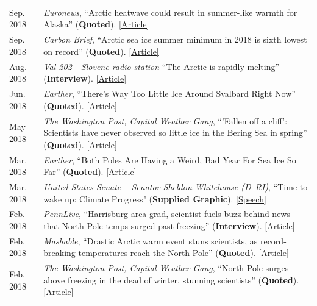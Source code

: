 \documentclass[margin,line,palatino,courier,10pt]{res}
\begin{document}
\begin{resume}
\begin{tabular}{@{}p{0.9in}p{4in}}
Sep. 2018 & \textit{Euronews}, ``Arctic heatwave could result in summer-like warmth for Alaska'' (\textbf{Quoted}). \href{https://www.euronews.com/2018/09/29/arctic-heatwave-could-result-in-summer-like-warmth-in-alaska}{[Article]}\\
Sep. 2018 & \textit{Carbon Brief}, ``Arctic sea ice summer minimum in 2018 is sixth lowest on record'' (\textbf{Quoted}). \href{https://www.carbonbrief.org/arctic-sea-ice-summer-minimum-in-2018-is-sixth-lowest-on-record}{[Article]}\\
Aug. 2018 & \textit{Val 202 - Slovene radio station} ``The Arctic is rapidly melting'' (\textbf{Interview}). \href{https://val202.rtvslo.si/2018/08/sonce-je-odprlo-zemljin-hladilnik/}{[Article]}\\
Jun. 2018 & \textit{Earther}, ``There's Way Too Little Ice Around Svalbard Right Now'' (\textbf{Quoted}). \href{https://earther.com/theres-way-too-little-ice-around-svalbard-right-now-1826567780}{[Article]}\\
May 2018 & \textit{The Washington Post, Capital Weather Gang}, ``'Fallen off a cliff': Scientists have never observed so little ice in the Bering Sea in spring'' (\textbf{Quoted}). \href{https://www.washingtonpost.com/news/capital-weather-gang/wp/2018/05/03/fallen-off-a-cliff-scientists-have-never-observed-so-little-ice-in-the-bering-sea-in-spring/?noredirect=on&utm_term=.cbcf2781b5e4}{[Article]}\\
Mar. 2018 & \textit{Earther}, ``Both Poles Are Having a Weird, Bad Year For Sea Ice So Far'' (\textbf{Quoted}). \href{https://earther.com/both-poles-are-having-a-weird-bad-year-for-sea-ice-so-1824074352}{[Article]}\\
Mar. 2018 & \textit{United States Senate -- Senator Sheldon Whitehouse (D--RI)}, ``Time to wake up: Climate Progress" (\textbf{Supplied Graphic}). \href{https://www.youtube.com/watch?v=C_E5OQgt2SE}{[Speech]}\\
Feb. 2018 & \textit{PennLive}, ``Harrisburg-area grad, scientist fuels buzz behind news that North Pole temps surged past freezing'' (\textbf{Interview}). \href{http://www.pennlive.com/news/2018/02/harrisburg-area_scientist_is_b.html}{[Article]}\\
Feb. 2018 & \textit{Mashable}, ``Drastic Arctic warm event stuns scientists, as record-breaking temperatures reach the North Pole'' (\textbf{Quoted}). \href{https://mashable.com/2018/02/26/arctic-heat-wave-north-pole-february-sea-ice/?utm_cid=hp-h-2#jZ.Ip1wPjkqD}{[Article]}\\
Feb. 2018 & \textit{The Washington Post, Capital Weather Gang}, ``North Pole surges above freezing in the dead of winter, stunning scientists'' (\textbf{Quoted}). \href{https://www.washingtonpost.com/news/capital-weather-gang/wp/2018/02/26/north-pole-surges-above-freezing-in-the-dead-of-winter-stunning-scientists/?utm_term=.6025384d6bf1}{[Article]}\\

\end{tabular}
\end{resume}
\end{document}
